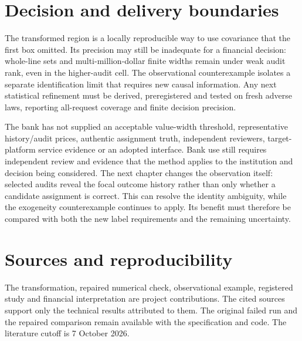 \section{Decision and delivery boundaries}

The transformed region is a locally reproducible way to use covariance that
the first box omitted. Its precision may still be inadequate for a financial decision: whole-line
sets and multi-million-dollar finite widths remain under weak audit rank,
even in the higher-audit cell. The observational counterexample isolates a separate identification limit that requires new causal information. Any next
statistical refinement must be derived, preregistered and tested on fresh
adverse laws, reporting all-request coverage and finite decision precision.

The bank has not supplied an acceptable value-width threshold, representative
history/audit prices, authentic assignment truth, independent reviewers,
target-platform service evidence or an adopted interface. Bank use still requires independent review and evidence that the
method applies to the institution and decision being considered. The next chapter changes the observation itself: selected audits reveal the focal outcome history rather than only whether a candidate assignment is correct. This can resolve the identity ambiguity, while the exogeneity counterexample continues to apply. Its benefit must therefore be compared with both the new label requirements and the remaining uncertainty.

\section*{Sources and reproducibility}

The transformation, repaired numerical check, observational example,
registered study and financial interpretation are project contributions.
The cited sources support only the technical results attributed to them.
The original failed run and the repaired comparison remain available with
the specification and code. The literature cutoff is 7 October 2026.

